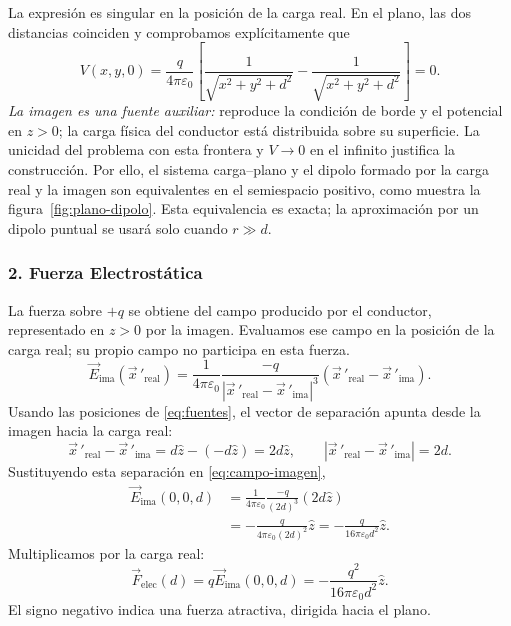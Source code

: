\documentclass[11pt]{article}
\begin{document}
La expresión es singular en la posición de la carga real. En el plano,
las dos distancias coinciden y comprobamos explícitamente que
\[
 V(x,y,0)=\frac{q}{4\pi\varepsilon_0}
 \left[\frac{1}{\sqrt{x^2+y^2+d^2}}
       -\frac{1}{\sqrt{x^2+y^2+d^2}}\right]=0.
\]
\textit{La imagen es una fuente auxiliar:} reproduce la condición de
borde y el potencial en $z>0$; la carga física del conductor está
distribuida sobre su superficie. La unicidad del problema con esta
frontera y $V\to0$ en el infinito justifica la construcción.
Por ello, el sistema carga--plano y el dipolo formado por la carga real
y la imagen son equivalentes en el semiespacio positivo, como muestra
la figura~\ref{fig:plano-dipolo}. Esta equivalencia es exacta;
la aproximación por un dipolo puntual se usará solo cuando $r\gg d$.

\subsubsection*{2. Fuerza Electrostática}
La fuerza sobre $+q$ se obtiene del campo producido por el conductor,
representado en $z>0$ por la imagen. Evaluamos ese campo en la posición
de la carga real; su propio campo no participa en esta fuerza.
\begin{equation}
 \vec{E}_{\mathrm{ima}}(\vec{x}\,'_{\mathrm{real}})
 =\frac{1}{4\pi\varepsilon_0}
 \frac{-q}{|\vec{x}\,'_{\mathrm{real}}-\vec{x}\,'_{\mathrm{ima}}|^3}
 (\vec{x}\,'_{\mathrm{real}}-\vec{x}\,'_{\mathrm{ima}}).
 \label{eq:campo-imagen}
\end{equation}
Usando las posiciones de \eqref{eq:fuentes}, el vector de separación
apunta desde la imagen hacia la carga real:
\[
 \vec{x}\,'_{\mathrm{real}}-\vec{x}\,'_{\mathrm{ima}}
 =d\hat{z}-(-d\hat{z})=2d\hat{z},\qquad
 |\vec{x}\,'_{\mathrm{real}}-\vec{x}\,'_{\mathrm{ima}}|=2d.
\]
Sustituyendo esta separación en \eqref{eq:campo-imagen},
\begin{align*}
 \vec{E}_{\mathrm{ima}}(0,0,d)
 &=\frac{1}{4\pi\varepsilon_0}\frac{-q}{(2d)^3}(2d\hat{z})\\
 &=-\frac{q}{4\pi\varepsilon_0(2d)^2}\hat{z}
 =-\frac{q}{16\pi\varepsilon_0d^2}\hat{z}.
\end{align*}
Multiplicamos por la carga real:
\begin{equation}
 \boxed{\vec{F}_{\mathrm{elec}}(d)
 =q\vec{E}_{\mathrm{ima}}(0,0,d)
 =-\frac{q^2}{16\pi\varepsilon_0d^2}\hat{z}.}
 \label{eq:plano-fuerza}
\end{equation}
El signo negativo indica una fuerza atractiva, dirigida hacia el plano.
\end{document}
